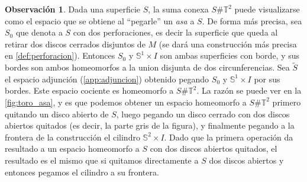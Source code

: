 \documentclass[10pt]{report}
\newcommand{\Esfera}{\mathbb{S}^2}
\newcommand{\Toro}{\mathbb{T}^2}
\theoremstyle{definition}
\newtheorem{obs}[defin]{Observación}
\begin{document}
\begin{obs}%
Dada una superficie $S$, la suma conexa $S\# \Toro$ puede visualizarse como el espacio que se obtiene al ``pegarle'' un \textit{asa} a $S$. De forma más precisa, sea $S_0$ que denota a $S$ con dos perforaciones, es decir la superficie que queda al retirar dos discos cerrados disjuntos de $M$ (se dará una construcción más precisa en \autoref{def:perforacion}). Entonces $S_0$ y $\mathbb{S}^1\times I$ son ambas superficies con borde, y sus bordes son ambos homeomorfos a la union disjunta de dos circunferencias. Sea $\tilde{S}$ el espacio adjunción (\autoref{app:adjuncion}) obtenido pegando $S_0$ y $\mathbb{S}^1\times I$ por sus bordes. Este espacio cociente es homeomorfo a $S\# \Toro$. La razón se puede ver en la \autoref{fig:toro_asa}, y es que podemos obtener un espacio homeomorfo a $S\# \Toro$ primero quitando un disco abierto de $S$, luego pegando un disco cerrado con dos discos abiertos quitados (es decir, la parte gris de la figura), y finalmente pegando a la frontera de la construcción el cilindro $\Esfera \times I$. Dado que la primera operación da resultado a un espacio homeomorfo a $S$ con dos discos abiertos quitados, el resultado es el mismo que si quitamos directamente a $S$ dos discos abiertos y entonces pegamos el cilindro a su frontera. \label{obs:toro_asa}

\end{obs}
\end{document}
